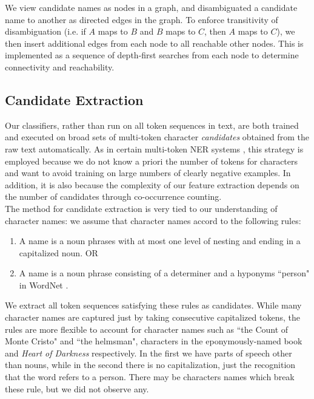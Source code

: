 \documentclass[12pt]{article}
\begin{document}
        We view candidate names as nodes in a graph, and disambiguated a candidate name to another as directed edges
        in the graph.  To enforce transitivity of disambiguation (i.e. if $A$ maps to $B$ and $B$ maps to $C$, then $A$
        maps to $C$), we then insert additional edges from each node to all reachable other nodes.  This is implemented
        as a sequence of depth-first searches from each node to determine connectivity and reachability.

    \subsection{Candidate Extraction}

        Our classifiers, rather than run on all token sequences in text, are both trained and executed on
        broad sets of multi-token character \emph{candidates} obtained from the raw text automatically. 
        As in certain multi-token NER systems \cite{da2004cluster}, this strategy is employed because we do not
        know a priori the number of tokens for characters and want to avoid training on large numbers
        of clearly negative examples. In addition, it is also because the complexity of our feature extraction 
        depends on the number of candidates through co-occurrence counting. \\

        The method for candidate extraction is very tied to our understanding of character names: we assume
        that character names accord to the following rules:
        \begin{enumerate}
            \setlength\itemsep{0em}
            \item A name is a noun phrases with at most one level of nesting and ending in a capitalized noun. OR
            \item A name is a noun phrase consisting of a determiner and a hyponyms ``person" in WordNet \cite{miller1995wordnet}. 
        \end{enumerate}

        We extract all token sequences satisfying these rules as candidates.
        While many character names are captured just by taking consecutive capitalized tokens, the rules
        are more flexible to account for character names such as ``the Count of Monte Cristo" and 
        ``the helmsman", characters in the eponymously-named book and \emph{Heart of Darkness} respectively.
        In the first we have parts of speech other than nouns, while in the second there is no capitalization,
        just the recognition that the word refers to a person. There may be characters names which break
        these rule, but we did not observe any.\\
\end{document}
